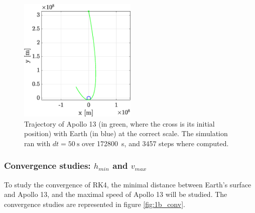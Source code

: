 \documentclass[a4paper,12pt,twoside]{article}
\begin{document}
\begin{figure}[h]
  \centering
  \includegraphics[width=0.5\textwidth]{graphs/ex1b_traj.eps}
  \caption{Trajectory of Apollo 13 (in green, where the cross is its initial position) with Earth (in blue) at the correct scale. The simulation ran with $dt=\SI{50}{\s}$ over \SI{172800}{\s}, and \num{3457} steps where computed.}
  \label{fig:1b_traj}
\end{figure}

\subsubsection{Convergence studies: $h_{min}$ and $v_{max}$}
To study the convergence of RK4, the minimal distance between Earth's surface and Apollo 13, and the maximal speed of Apollo 13 will be studied.
The convergence studies are represented in figure \ref{fig:1b_conv}.
\end{document}
